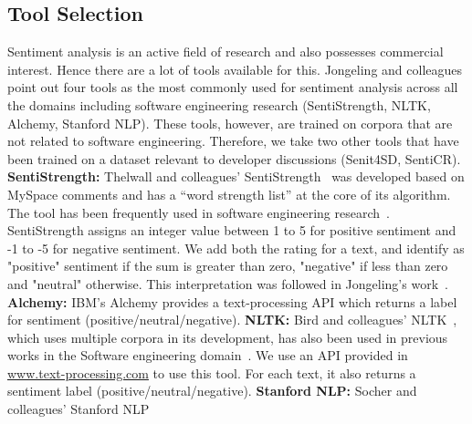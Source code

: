 \subsection{Tool Selection}
Sentiment analysis is an active field of research 
and also possesses commercial interest. 
Hence there are a lot of tools available for this. 
Jongeling and colleagues point out four tools 
as the most commonly used for sentiment analysis 
across all the domains 
including software engineering research 
(SentiStrength, NLTK, Alchemy, Stanford NLP).
These tools, however, 
are trained on corpora 
that are not related to software engineering.
Therefore, we take two other tools that have been trained on a dataset relevant to developer discussions (Senit4SD, SentiCR). 
\newline
\indent \textbf{SentiStrength:} Thelwall and colleagues' SentiStrength~\cite{thelwall2010sentiment} 
was developed based on MySpace comments 
and has a ``word strength list'' 
at the core of its algorithm. 
The tool has been frequently used in software engineering research~\cite{garcia2013role,guzman2014sentiment,novielli2015challenges,guzman2013towards,sinha2016analyzing}. 
SentiStrength assigns 
an integer value between 1 to 5 for positive sentiment 
and -1 to -5 for negative sentiment. 
We add both the rating for a text, 
and identify as "positive" sentiment if the sum is greater than zero, "negative" if less than zero 
and "neutral" otherwise. 
This interpretation was followed in Jongeling's work~\cite{jongeling2017negative}.
\newline
\indent\textbf{Alchemy:} IBM's Alchemy 
provides a text-processing API 
which returns a label for sentiment 
(positive/neutral/negative). 
\newline
\indent\textbf{NLTK:} Bird and colleagues' NLTK~\cite{bird2009natural}, 
which uses multiple corpora in its development, 
has also been used in previous works 
in the Software engineering domain~\cite{pletea2014security,rousinopoulos2014sentiment}. 
We use an API provided in \href{www.text-processing.com}{www.text-processing.com} 
to use this tool. 
For each text, it also returns a sentiment label
(positive/neutral/negative).
\newline
\indent\textbf{Stanford NLP:} Socher and colleagues' Stanford NLP 
